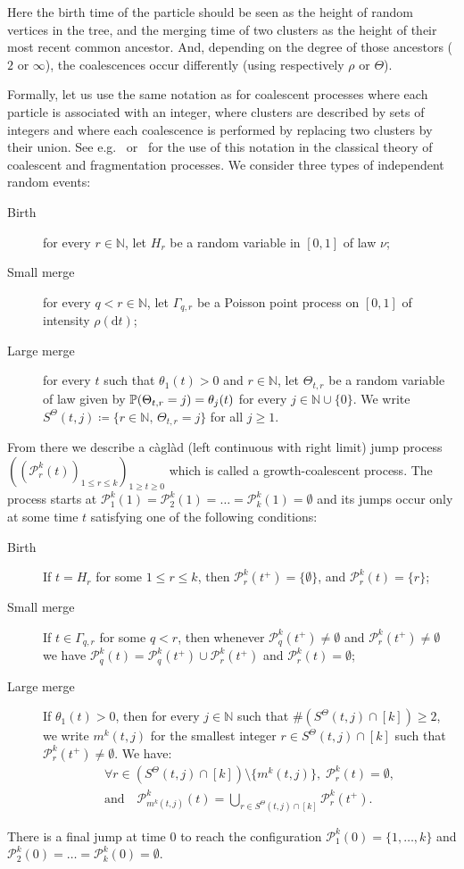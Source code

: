 \documentclass[10pt]{amsart}
\theoremstyle{definition}\newtheorem{defi}[theo]{Definition}\newtheorem{rema}[theo]{Remark}\newtheorem{exam}[theo]{Example}\newtheorem{exem}[theo]{Example}\newtheorem{nota}[theo]{Notation}
\newcommand{\proba}[1]{\mathbb{P}\left(#1\right)}
\newcommand{\rmd}{\mathrm{d}}
\newcommand{\N}{\mathbb{N}}
\newcommand{\1}{\mathbbm{1}}
\newcommand{\Part}{\mathcal{P}}
\let\originalleft\left
\let\originalright\right
\renewcommand{\left}{\mathopen{}\mathclose\bgroup\originalleft}
\renewcommand{\right}{\aftergroup\egroup\originalright}
\let\oldforall\forall
\renewcommand*{\forall}{\mathrel{\oldforall}}
\begin{document}
Here the birth time of the particle should be seen as the height of random vertices in the tree, and the merging time of two clusters as the height of their most recent common ancestor. And, depending on the degree of those ancestors ($2$ or $\infty$), the coalescences occur differently (using respectively $\rho$ or $\Theta$).


Formally, let us use the same notation as for coalescent processes where each particle is associated with an integer, where clusters are described by sets of integers and where each coalescence is performed by replacing two clusters by their union. See e.g.\@~\cite{Pit06} or~\cite{Ber06} for the use of this notation in the classical theory of coalescent and fragmentation processes. We consider three types of independent random events:
\begin{description}
\item[Birth] for every $r\in \N$, let $H_r$ be a random variable in $[0,1]$ of law $\nu$;
\item[{Small merge}] for every $q<r\in \N$, let $\Gamma_{q,r}$ be a Poisson point process on $[0,1]$ of intensity $\rho(\rmd t)$;
\item[{Large merge}] for every $t$ such that $\theta_1(t)>0$ and $r\in \N$, let $\Theta_{t,r}$ be a random variable of law given by $\proba{\Theta_{t,r}=j}=\theta_j(t)$ for every $j\in \N\cup \{0\}$. We write $S^\Theta(t,j)\coloneqq \{r\in \N,\, \Theta_{t,r}=j \}$ for all $j \ge 1$.
\end{description}
From there we describe a {{càglàd}} (left continuous with right limit) jump process $((\Part_r^k(t))_{1\leq r \leq k})_{1\geq t \geq 0}$ which is called a growth-coalescent process. The process starts at $\Part_1^k(1)=\Part_2^k(1)=\dots =\Part_k^k(1)=\emptyset $ and its jumps occur only at some time $t$ satisfying one of the following conditions:
\begin{description}
\item[{Birth}] If $t=H_r$ for some $1\leq r \leq k$, then $\Part_r^k(t^+)=\{\emptyset\}$, and $\Part_r^k(t)=\{r\}$;
\item[{Small merge}] If $t\in \Gamma_{q,r}$ for some $q<r$, then whenever $\Part_q^k(t^+)\neq \emptyset$ and $\Part_r^k(t^+)\neq \emptyset$ we have $\Part_q^k(t)=\Part_q^k(t^+)\cup \Part_r^k(t^+)$ and $\Part_r^k(t)=\emptyset$;
\item[{Large merge}] If $\theta_1(t)>0$, then for every $j\in \N$ such that $\# (S^\Theta (t,j) \cap [k])\ge 2$, we write $m^k(t,j)$ for the smallest integer $r\in S^\Theta(t,j)\cap[k]$ such that $\Part_r^k(t^+)\neq \emptyset$. We have:
\begin{multline*}
\forall r\in (S^\Theta(t,j)\cap[k]) \setminus \{m^k(t,j) \},
\; \Part_r^k(t)=\emptyset,\\
\text{and} \quad \Part_{m^k(t,j)}^k(t)=\bigcup_{r\in S^\Theta(t,j)\cap[k]} \Part_{r}^k(t^+).
\end{multline*}
\end{description}
There is a final jump at time $0$ to reach the configuration $\Part_1^k(0)=\{1,\dots, k\}$ and $\Part_2^k(0)=\dots=\Part_k^k(0)=\emptyset$.
\end{document}
